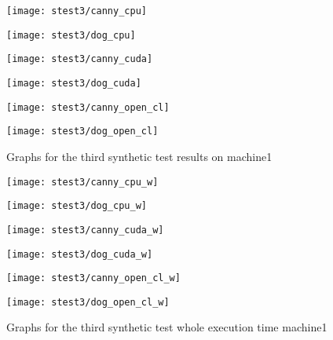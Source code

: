 \begin{figure}[H]
\centering
\begin{minipage}[t]{.49\textwidth}
\centering
\texttt{[image: stest3/canny\_cpu]}
\end{minipage}
\begin{minipage}[t]{.49\textwidth}
\centering
\texttt{[image: stest3/dog\_cpu]}
\end{minipage}
\begin{minipage}[t]{.49\textwidth}
\centering
\texttt{[image: stest3/canny\_cuda]}
\end{minipage}
\begin{minipage}[t]{.49\textwidth}
\centering
\texttt{[image: stest3/dog\_cuda]}
\end{minipage}
\begin{minipage}[t]{.49\textwidth}
\centering
\texttt{[image: stest3/canny\_open\_cl]}
\end{minipage}
\begin{minipage}[t]{.49\textwidth}
\centering
\texttt{[image: stest3/dog\_open\_cl]}
\end{minipage}
\caption{Graphs for the third synthetic test results on machine1}
\label{fig:test3s}
\end{figure}

\begin{figure}[H]
\centering
\begin{minipage}[t]{.49\textwidth}
\centering
\texttt{[image: stest3/canny\_cpu\_w]}
\end{minipage}
\begin{minipage}[t]{.49\textwidth}
\centering
\texttt{[image: stest3/dog\_cpu\_w]}
\end{minipage}
\begin{minipage}[t]{.49\textwidth}
\centering
\texttt{[image: stest3/canny\_cuda\_w]}
\end{minipage}
\begin{minipage}[t]{.49\textwidth}
\centering
\texttt{[image: stest3/dog\_cuda\_w]}
\end{minipage}
\begin{minipage}[t]{.49\textwidth}
\centering
\texttt{[image: stest3/canny\_open\_cl\_w]}
\end{minipage}
\begin{minipage}[t]{.49\textwidth}
\centering
\texttt{[image: stest3/dog\_open\_cl\_w]}
\end{minipage}
\caption{Graphs for the third synthetic test whole execution time machine1}
\label{fig:test3sw}
\end{figure}

